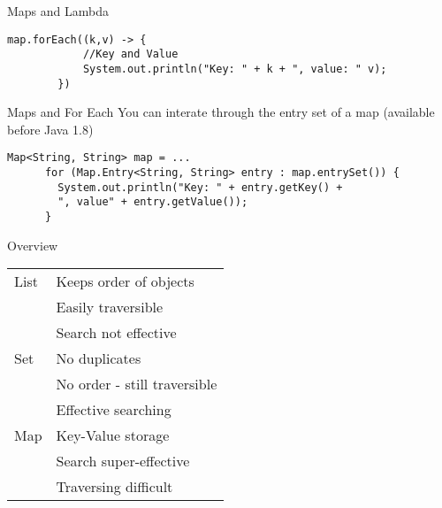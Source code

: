 \begin{frame}[fragile]{Maps and Lambda}
    \begin{lstlisting}[basicstyle=\ttfamily\scriptsize]
        map.forEach((k,v) -> {
            //Key and Value
            System.out.println("Key: " + k + ", value: " v);
        })
    \end{lstlisting}
\end{frame}

\begin{frame}[fragile]{Maps and For Each}
  You can interate through the entry set of a map (available before Java 1.8)
    \begin{lstlisting}[basicstyle=\ttfamily\scriptsize]
      Map<String, String> map = ...
      for (Map.Entry<String, String> entry : map.entrySet()) {
        System.out.println("Key: " + entry.getKey() +
        ", value" + entry.getValue());
      }
    \end{lstlisting}
\end{frame}

\begin{frame}{Overview}
    \begin{center}
        \begin{tabular}{ l | l }
            List & Keeps order of objects \\
                 & Easily traversible \\
                 & Search not effective \\
            \hline
            Set  & No duplicates \\
                 & No order - still traversible \\
                 & Effective searching \\
            \hline
            Map  & Key-Value storage \\
                 & Search super-effective \\
                 & Traversing difficult
            
        \end{tabular}
    \end{center}
\end{frame}

